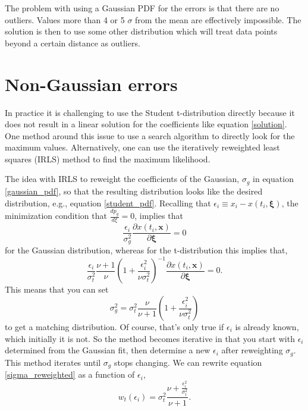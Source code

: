 \documentclass[twocol]{ametsoc}
\begin{document}
The problem with using a Gaussian PDF for the errors is that there are no outliers. Values more than 4 or 5 $\sigma$ from the mean are effectively impossible. The solution is then to use some other distribution which will treat data points beyond a certain distance as outliers.

\section{Non-Gaussian errors}

In practice it is challenging to use the Student t-distribution directly because it does not result in a linear solution for the coefficients like equation \ref{solution}. One method around this issue to use a search algorithm to directly look for the maximum values. Alternatively, one can use the iteratively reweighted least squares (IRLS) method to find the maximum likelihood.

The idea with IRLS to reweight the coefficients of the Gaussian, $\sigma_g$ in equation \ref{gaussian_pdf}, so that the resulting distribution looks like the desired distribution, e.g., equation \ref{student_pdf}. Recalling that $\epsilon_i \equiv x_i - x(t_i,\mathbf{\xi})$, the minimization condition that $\frac{d p_g}{d\xi}=0$, implies that
\begin{equation}
\frac{\epsilon_i}{\sigma_g^2} \frac{\partial x(t_i,\mathbf{x})}{\partial \mathbf{\xi}} = 0
\end{equation}
for the Gaussian distribution, whereas for the t-distribution this implies that,
\begin{equation}
 \frac{\epsilon_i}{\sigma_t^2} \frac{\nu+1}{\nu} \left( 1 + \frac{\epsilon_i^2}{\nu \sigma_t^2} \right)^{-1}  \frac{\partial x(t_i,\mathbf{x})}{\partial \mathbf{\xi}}  = 0.
\end{equation}
This means that you can set
\begin{equation}
\sigma_g^2 =   \sigma_t^2 \frac{\nu}{\nu+1} \left( 1 + \frac{\epsilon_i^2}{\nu \sigma_t^2} \right)
\label{sigma_reweighted}
\end{equation}
to get a matching distribution. Of course, that's only true if $\epsilon_i$ is already known, which initially it is not. So the method becomes iterative in that you start with $\epsilon_i$ determined from the Gaussian fit, then determine a new $\epsilon_i$ after reweighting $\sigma_g$. This method iterates until $\sigma_g$ stops changing. We can rewrite equation \ref{sigma_reweighted} as a function of $\epsilon_i$,
\begin{equation}
\label{t-weight}
w_t(\epsilon_i) = \sigma_t^2 \frac{\nu  + \frac{\epsilon_i^2}{\sigma_t^2}}{\nu+1}.
\end{equation}
\end{document}
